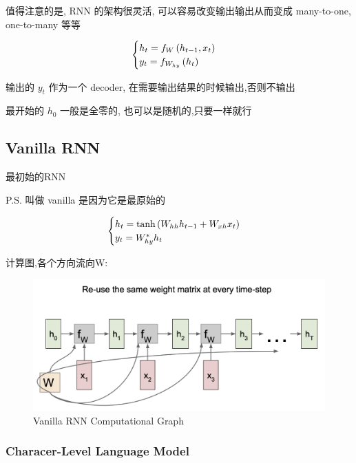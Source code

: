 	值得注意的是, RNN 的架构很灵活, 可以容易改变输出输出从而变成 many-to-one, one-to-many 等等

	\begin{equation}
		\begin{cases}
			h_t = f_W\left( h_{t-1}, x_t\right)
			\\
			y_t = f_{W_{hy}}\left( h_t\right)
		\end{cases}
	\end{equation}

	输出的 $y_t$ 作为一个 decoder, 在需要输出结果的时候输出,否则不输出

	最开始的 $h_0$ 一般是全零的, 也可以是随机的,只要一样就行

	\subsection{Vanilla RNN}

	最初始的RNN

	P.S. 叫做 vanilla 是因为它是最原始的

	\begin{equation}
		\begin{cases}
			h_t = \tanh\left( W_{hh}h_{t-1} + W_{xh}x_t\right)
			\\
			y_t = W_{hy}^*h_t
		\end{cases}
	\end{equation}
	
	计算图,各个方向流向W:
	
	\begin{figure}[htbp]
		\centering
		\includegraphics[scale=0.2]{figures/vanilla_rnn.png}
		\caption{Vanilla RNN Computational Graph}
	\end{figure}
	
	\subsubsection{Characer-Level Language Model}

